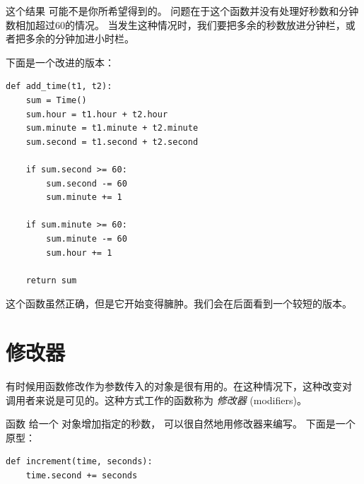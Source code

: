 {%

这个结果  可能不是你所希望得到的。
问题在于这个函数并没有处理好秒数和分钟数相加超过60的情况。
当发生这种情况时，我们要把多余的秒数放进分钟栏，或者把多余的分钟加进小时栏。

下面是一个改进的版本：

\begin{lstlisting}
def add_time(t1, t2):
    sum = Time()
    sum.hour = t1.hour + t2.hour
    sum.minute = t1.minute + t2.minute
    sum.second = t1.second + t2.second

    if sum.second >= 60:
        sum.second -= 60
        sum.minute += 1

    if sum.minute >= 60:
        sum.minute -= 60
        sum.hour += 1

    return sum
\end{lstlisting}


这个函数虽然正确，但是它开始变得臃肿。我们会在后面看到一个较短的版本。

\section{修改器}

\label{increment}
  


有时候用函数修改作为参数传入的对象是很有用的。在这种情况下，这种改变对
调用者来说是可见的。这种方式工作的函数称为 {\em 修改器} (modifiers)。



函数  给一个  对象增加指定的秒数，
可以很自然地用修改器来编写。  下面是一个原型：

\begin{lstlisting}
def increment(time, seconds):
    time.second += seconds


\end{lstlisting}}
